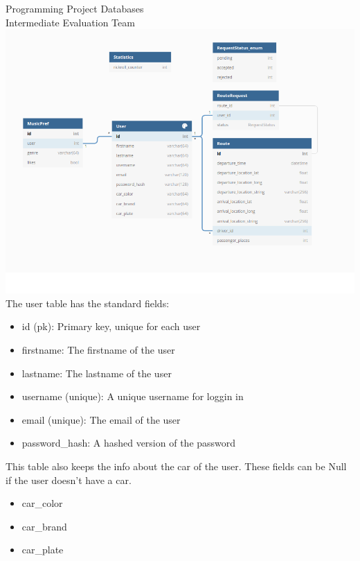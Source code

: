 \documentclass{article}
\newcounter{team}
\begin{document}
\begin{Minutes}{Programming Project Databases \\ Intermediate Evaluation Team }
    	\includegraphics[scale=2]{ERD2.png}
            The user table has the standard fields:
            \begin{itemize}
                \item id (pk): Primary key, unique for each user
                \item firstname: The firstname of the user
                \item lastname: The lastname of the user
                \item username (unique): A unique username for loggin in
                \item email (unique): The email of the user
                \item password\_hash: A hashed version of the password
            \end{itemize}
            This table also keeps the info about the car of the user.
            These fields can be Null if the user doesn't have a car.
            \begin{itemize}
                \item car\_color
                \item car\_brand
                \item car\_plate
            \end{itemize}


\end{Minutes}
\end{document}
